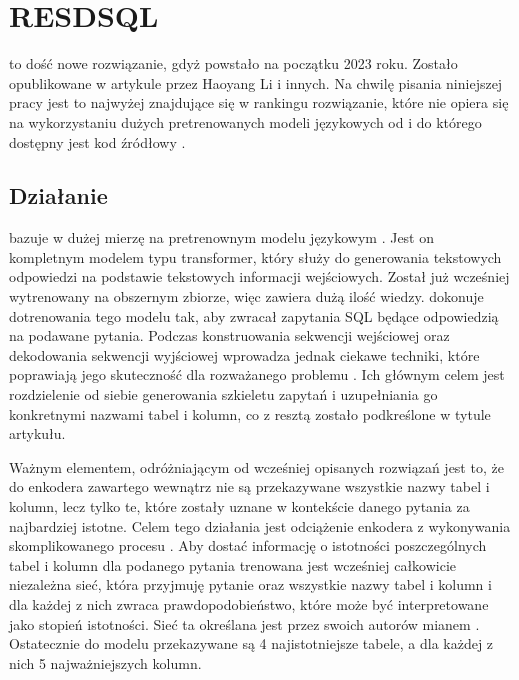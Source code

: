 \section{RESDSQL}
 to dość nowe rozwiązanie, gdyż powstało na początku 2023 roku. Zostało opublikowane w artykule   przez Haoyang Li i innych. Na chwilę pisania niniejszej pracy jest to najwyżej znajdujące się w rankingu  rozwiązanie, które nie opiera się na wykorzystaniu dużych pretrenowanych modeli językowych od  i do którego dostępny jest kod źródłowy .

\subsection{Działanie}
 bazuje w dużej mierzę na pretrenownym modelu językowym  . Jest on kompletnym modelem typu transformer, który służy do generowania tekstowych odpowiedzi na podstawie tekstowych informacji wejściowych. Został już wcześniej wytrenowany na obszernym zbiorze, więc zawiera dużą ilość wiedzy.  dokonuje dotrenowania tego modelu tak, aby zwracał zapytania SQL będące odpowiedzią na podawane pytania. Podczas konstruowania sekwencji wejściowej oraz dekodowania sekwencji wyjściowej wprowadza jednak ciekawe techniki, które poprawiają jego skuteczność dla rozważanego problemu . Ich głównym celem jest rozdzielenie od siebie generowania szkieletu zapytań i uzupełniania go konkretnymi nazwami tabel i kolumn, co z resztą zostało podkreślone w tytule artykułu.

Ważnym elementem, odróżniającym  od wcześniej opisanych rozwiązań jest to, że do enkodera zawartego wewnątrz  nie są przekazywane wszystkie nazwy tabel i kolumn, lecz tylko te, które zostały uznane w kontekście danego pytania za najbardziej istotne. Celem tego działania jest odciążenie enkodera z wykonywania skomplikowanego procesu . Aby dostać informację o istotności poszczególnych tabel i kolumn dla podanego pytania trenowana jest wcześniej całkowicie niezależna sieć, która przyjmuję pytanie oraz wszystkie nazwy tabel i kolumn i dla każdej z nich zwraca prawdopodobieństwo, które może być interpretowane jako stopień istotności. Sieć ta określana jest przez swoich autorów mianem . Ostatecznie do modelu  przekazywane są 4 najistotniejsze tabele, a dla każdej z nich 5 najważniejszych kolumn.


